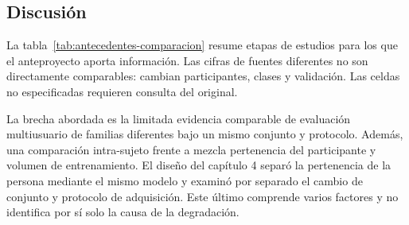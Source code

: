 \subsection{Discusión}
La tabla~\ref{tab:antecedentes-comparacion} resume etapas de estudios para los que el anteproyecto aporta información. Las cifras de fuentes diferentes no son directamente comparables: cambian participantes, clases y validación. Las celdas no especificadas requieren consulta del original.
\begin{table}[H]
\centering
\caption{Comparación de etapas de antecedentes y del presente estudio. Fuente: anteproyecto e informe. NE: no especificado en las fuentes disponibles.}
\label{tab:antecedentes-comparacion}
\end{table}

La brecha abordada es la limitada evidencia comparable de evaluación multiusuario \loso{} de familias diferentes bajo un mismo conjunto y protocolo. Además, una comparación intra-sujeto frente a \loso{} mezcla pertenencia del participante y volumen de entrenamiento. El diseño del capítulo 4 separó la pertenencia de la persona mediante el mismo modelo y examinó por separado el cambio de conjunto y protocolo de adquisición. Este último comprende varios factores y no identifica por sí solo la causa de la degradación.
